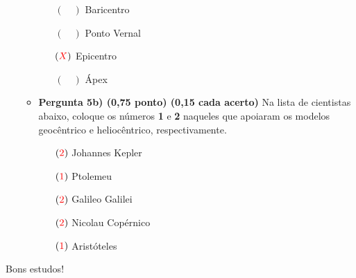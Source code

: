 \documentclass[a4paper, 12pt]{article}
\newcommand{\red}[1]{\textcolor{red}{#1}}
\begin{document}
\begin{flushleft}
\begin{itemize}
\begin{itemize}
\begin{multicols}{2}
					\begin{itemize}
						\item[$(\quad)$] Baricentro
						\item[$(\quad)$] Ponto Vernal
						\item[$(\red{X})$] Epicentro
						\item[$(\quad)$] Ápex
					\end{itemize}
				\end{multicols}
			\item \textbf{Pergunta 5b) (0,75 ponto) (0,15 cada acerto)} Na lista de cientistas abaixo, coloque os números \textbf{1} e \textbf{2} naqueles que apoiaram os modelos geocêntrico e heliocêntrico, respectivamente.
				\begin{itemize}
					\item[$(\red{2})$] Johannes Kepler
					\item[$(\red{1})$] Ptolemeu
					\item[$(\red{2})$] Galileo Galilei
					\item[$(\red{2})$] Nicolau Copérnico
					\item[$(\red{1})$] Aristóteles
				\end{itemize}

		\end{itemize}
			
	\end{itemize}
	\end{flushleft}
	\begin{flushright}
		\begin{large}
			Bons estudos!
		\end{large}
	\end{flushright}
\end{document}
